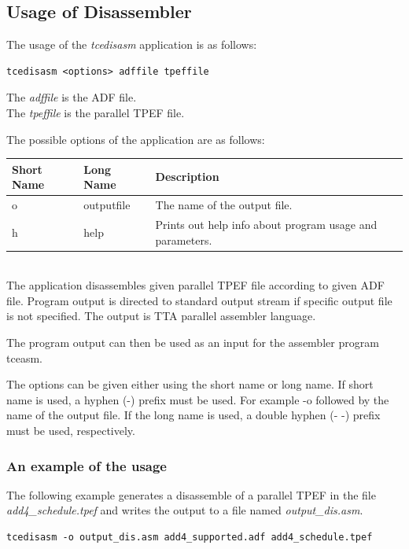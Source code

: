 \documentclass[a4paper,twoside]{tceusermanual}
\begin{document}
\subsection{Usage of Disassembler}

The usage of the \emph{tcedisasm} application is as follows:

\begin{verbatim}
tcedisasm <options> adffile tpeffile
\end{verbatim}

The \emph{adffile} is the ADF file. \\
The \emph{tpeffile} is the parallel TPEF file.

The possible options of the application are as follows:\\

\begin{tabular}{p{}p{}
                p{}}
\textbf{Short Name} &\textbf{Long Name} &\textbf{Description} \\
\hline
o & outputfile  & The name of the output file.\\
h & help        & Prints out help info about program usage and parameters.\\
\end{tabular}\\

The application disassembles given parallel TPEF file according to given ADF
file. Program output is directed to standard output stream if specific output
file is not specified. The output is TTA parallel assembler language.

The program output can then be used as an input for the assembler program
tceasm.

The options can be given either using the short name or long name. If
short name is used, a hyphen (-) prefix must be used. For example -o
followed by the name of the output file. If the long name is used, a
double hyphen (- -) prefix must be used, respectively.

\subsubsection{An example of the usage}

The following example generates a disassemble of a parallel TPEF in the file
\emph{add4\_schedule.tpef} and writes the output to a file named
\emph{output\_dis.asm}.
 
\begin{verbatim}
tcedisasm -o output_dis.asm add4_supported.adf add4_schedule.tpef 
\end{verbatim}
\end{document}
